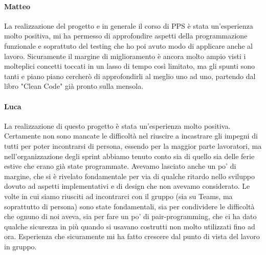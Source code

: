 \paragraph{Matteo}
La realizzazione del progetto e in generale il corso di PPS è stata un'esperienza molto positiva, mi ha permesso di approfondire aspetti della programmazione funzionale e soprattuto del testing che ho poi avuto modo di applicare anche al lavoro.
Sicuramente il margine di miglioramento è ancora molto ampio visti i molteplici concetti toccati in un lasso di tempo così limitato, ma gli spunti sono tanti e piano piano cercherò di approfondirli al meglio uno ad uno, partendo dal libro "Clean Code" già pronto sulla mensola.
\paragraph{Luca}
La realizzazione di questo progetto è stata un’esperienza molto positiva. Certamente non sono mancate le difficoltà nel riuscire a incastrare gli impegni di tutti per poter incontrarsi di persona, essendo per la maggior parte lavoratori, ma nell’organizzazione degli sprint abbiamo tenuto conto sia di quello sia delle ferie estive che erano già state programmate. Avevamo lasciato anche un po’ di margine, che si è rivelato fondamentale per via di qualche ritardo nello sviluppo dovuto ad aspetti implementativi e di design che non avevamo considerato.
Le volte in cui siamo riusciti ad incontrarci con il gruppo (sia su Teams, ma soprattutto di persona) sono state fondamentali, sia per condividere le difficoltà che ognuno di noi aveva, sia per fare un po’ di pair-programming, che ci ha dato qualche sicurezza in più quando si usavano costrutti non molto utilizzati fino ad ora.
Esperienza che sicuramente mi ha fatto crescere dal punto di vista del lavoro in gruppo.
